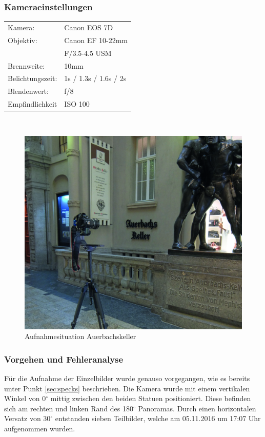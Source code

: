 \documentclass[liststotoc,bibtotoc,fontsize=14pt,]{scrreprt}
\begin{document}
	\subsubsection{Kameraeinstellungen}
	\begin{minipage}{0.58\textwidth}
		\begin{tabular}{ll}
			Kamera: &Canon EOS 7D \\
			Objektiv: &Canon EF 10-22mm \\
			& F/3.5-4.5 USM\\		
			Brennweite:& 10mm \\
			Belichtungszeit: & 1s / 1.3s / 1.6s / 2s\\
			Blendenwert: & f/8\\
			Empfindlichkeit & ISO 100 \\
		\end{tabular}\\
	\end{minipage}%
	\begin{minipage}{0.42\textwidth}
		\begin{figure}[H]
			\includegraphics[width=\linewidth]{img/places/ak.jpg}
			\caption{Aufnahmesituation Auerbachskeller}
			\label{img:ak}
		\end{figure}
	\end{minipage}%
	

	
	\subsubsection{Vorgehen und Fehleranalyse}
	Für die Aufnahme der Einzelbilder wurde genauso vorgegangen, wie es bereits unter Punkt \ref{sec:specks} beschrieben. Die Kamera wurde mit einem vertikalen Winkel von 0$^\circ$ mittig zwischen den beiden Statuen positioniert. Diese befinden sich am rechten und linken Rand des 180$^\circ$ Panoramas. Durch einen horizontalen Versatz von 30$^\circ$ entstanden sieben Teilbilder, welche am 05.11.2016 um 17:07 Uhr aufgenommen wurden. 
\end{document}
